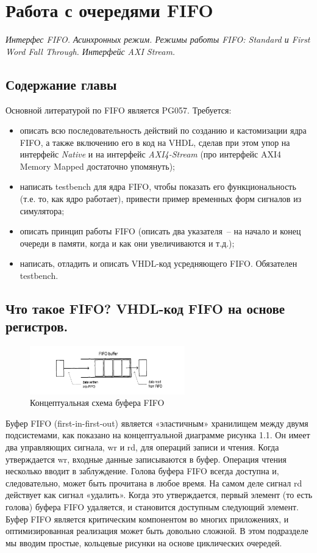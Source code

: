 \chapter{Работа с очередями FIFO}

\emph{Интерфес FIFO. Асинхронных режим. Режимы работы FIFO: Standard и First Word Fall Through. Интерфейс AXI Stream.}

\section{Содержание главы}

Основной литературой по FIFO является PG057. Требуется:
\begin{itemize}
\item описать всю последовательность действий по созданию и кастомизации ядра FIFO, а также включению его в код на VHDL, сделав при этом упор на интерфейс \emph{Native} и на интерфейс \emph{AXI4-Stream} (про интерфейс AXI4 Memory Mapped достаточно упомянуть);
\item написать testbench для ядра FIFO, чтобы показать его функциональность (т.е. то, как ядро работает), привести пример временных форм сигналов из симулятора;
\item описать принцип работы FIFO (описать два указателя~-- на начало и конец очереди в памяти, когда и как они увеличиваются и т.д.);
\item написать, отладить и описать VHDL-код усредняющего FIFO. Обязателен testbench.
\end{itemize}

\section{Что такое FIFO? VHDL-код FIFO на основе \\ регистров.}

\begin{figure}[h]
\centering
\includegraphics[width=0.6\textwidth]{fifo_bufer}
\caption{Концептуальная схема буфера FIFO}
\label{fifo_bufer_label}
\end{figure}

Буфер FIFO (first-in-first-out) является «эластичным» хранилищем между двумя подсистемами, как показано на концептуальной диаграмме рисунка 1.1.  Он имеет два управляющих сигнала, wr и rd, для операций записи и чтения. Когда утверждается wr, входные данные записываются в буфер. Операция чтения несколько вводит в заблуждение. Голова буфера FIFO всегда доступна и, следовательно, может быть прочитана в любое время. На самом деле сигнал rd действует как сигнал «удалить». Когда это утверждается, первый элемент (то есть голова) буфера FIFO удаляется, и становится доступным следующий элемент. Буфер FIFO является критическим компонентом во многих приложениях, и оптимизированная реализация может быть довольно сложной. В этом подразделе мы вводим простые,  кольцевые рисунки на основе циклических очередей.


